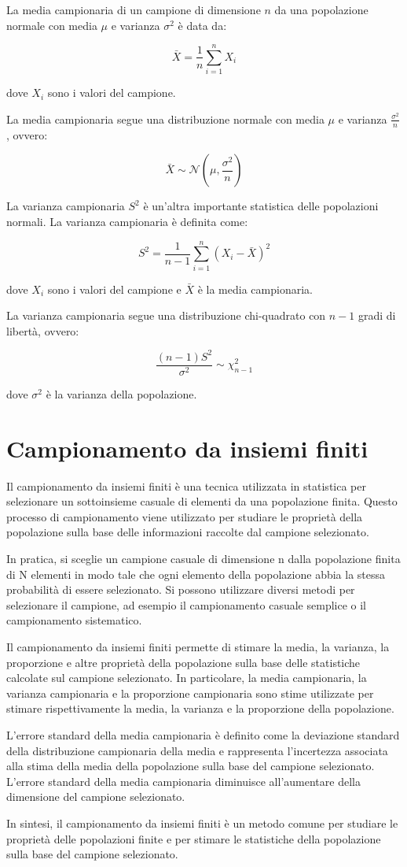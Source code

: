 La media campionaria di un campione di dimensione $n$ da una popolazione normale con media $\mu$ e varianza $\sigma^2$ è data da:

$$\bar{X} = \frac{1}{n} \sum_{i=1}^{n} X_i$$

dove $X_i$ sono i valori del campione.

La media campionaria segue una distribuzione normale con media $\mu$ e varianza $\frac{\sigma^2}{n}$, ovvero:

$$\bar{X} \sim \mathcal{N}(\mu, \frac{\sigma^2}{n})$$

La varianza campionaria $S^2$ è un'altra importante statistica delle popolazioni normali. La varianza campionaria è definita come:

$$S^2 = \frac{1}{n-1} \sum_{i=1}^{n} (X_i - \bar{X})^2$$

dove $X_i$ sono i valori del campione e $\bar{X}$ è la media campionaria.

La varianza campionaria segue una distribuzione chi-quadrato con $n-1$ gradi di libertà, ovvero:

$$\frac{(n-1)S^2}{\sigma^2} \sim \chi^2_{n-1}$$

dove $\sigma^2$ è la varianza della popolazione.

\section{Campionamento da insiemi finiti}
Il campionamento da insiemi finiti è una tecnica utilizzata in statistica per selezionare un sottoinsieme casuale di elementi da una popolazione finita. Questo processo di campionamento viene utilizzato per studiare le proprietà della popolazione sulla base delle informazioni raccolte dal campione selezionato.

In pratica, si sceglie un campione casuale di dimensione n dalla popolazione finita di N elementi in modo tale che ogni elemento della popolazione abbia la stessa probabilità di essere selezionato. Si possono utilizzare diversi metodi per selezionare il campione, ad esempio il campionamento casuale semplice o il campionamento sistematico.

Il campionamento da insiemi finiti permette di stimare la media, la varianza, la proporzione e altre proprietà della popolazione sulla base delle statistiche calcolate sul campione selezionato. In particolare, la media campionaria, la varianza campionaria e la proporzione campionaria sono stime utilizzate per stimare rispettivamente la media, la varianza e la proporzione della popolazione.

L'errore standard della media campionaria è definito come la deviazione standard della distribuzione campionaria della media e rappresenta l'incertezza associata alla stima della media della popolazione sulla base del campione selezionato. L'errore standard della media campionaria diminuisce all'aumentare della dimensione del campione selezionato.

In sintesi, il campionamento da insiemi finiti è un metodo comune per studiare le proprietà delle popolazioni finite e per stimare le statistiche della popolazione sulla base del campione selezionato.
